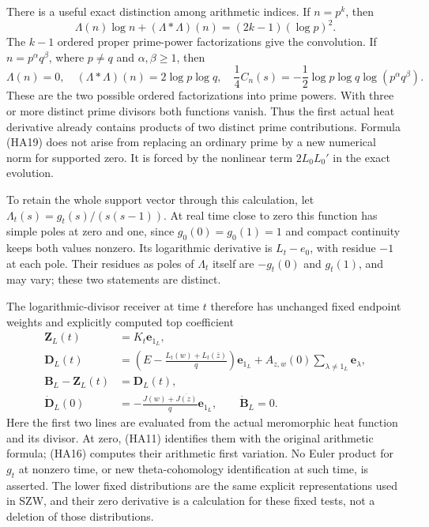 \documentclass[
  10pt,
  a4paper,
]{article}
\begin{document}
There is a useful exact distinction among arithmetic indices. If
\(n=p^k\), then \[
\Lambda(n)\log n+(\Lambda*\Lambda)(n)
=(2k-1)(\log p)^2.
\tag{HA18}
\] The \(k-1\) ordered proper prime-power factorizations give the
convolution. If \(n=p^\alpha q^\beta\), where \(p\ne q\) and
\(\alpha,\beta\ge1\), then \[
\Lambda(n)=0,\quad (\Lambda*\Lambda)(n)=2\log p\log q,
\quad \frac14C_n(s)=-\frac12\log p\log q\log(p^\alpha q^\beta).
\tag{HA19}
\] These are the two possible ordered factorizations into prime powers.
With three or more distinct prime divisors both functions vanish. Thus
the first actual heat derivative already contains products of two
distinct prime contributions. Formula (HA19) does not arise from
replacing an ordinary prime by a new numerical norm for supported zero.
It is forced by the nonlinear term \(2L_0L_0'\) in the exact evolution.

To retain the whole support vector through this calculation, let
\(\Lambda_t(s)=g_t(s)/(s(s-1))\). At real time close to zero this
function has simple poles at zero and one, since \(g_0(0)=g_0(1)=1\) and
compact continuity keeps both values nonzero. Its logarithmic derivative
is \(L_t-e_0\), with residue \(-1\) at each pole. Their residues as
poles of \(\Lambda_t\) itself are \(-g_t(0)\) and \(g_t(1)\), and may
vary; these two statements are distinct.

The logarithmic-divisor receiver at time \(t\) therefore has unchanged
fixed endpoint weights and explicitly computed top coefficient \[
\begin{aligned}
\boldsymbol Z_L(t)&=K_t\mathbf e_{1_L},\\
\boldsymbol D_L(t)&=\left(E-\frac{L_t(w)+L_t(\bar z)}q\right)\mathbf e_{1_L}
+A_{z,w}(0)\sum_{\lambda\ne1_L}\mathbf e_\lambda,\\
\boldsymbol B_L-\boldsymbol Z_L(t)&=\boldsymbol D_L(t),\\
\dot{\boldsymbol D}_L(0)&=-\frac{J(w)+\overline{J(z)}}q\mathbf e_{1_L},
\qquad \dot{\boldsymbol B}_L=0.
\end{aligned}\tag{HA20}
\] Here the first two lines are evaluated from the actual meromorphic
heat function and its divisor. At zero, (HA11) identifies them with the
original arithmetic formula; (HA16) computes their arithmetic first
variation. No Euler product for \(g_t\) at nonzero time, or new
theta-cohomology identification at such time, is asserted. The lower
fixed distributions are the same explicit representations used in SZW,
and their zero derivative is a calculation for these fixed tests, not a
deletion of those distributions.
\end{document}
